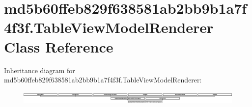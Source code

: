 \hypertarget{classmd5b60ffeb829f638581ab2bb9b1a7f4f3f_1_1TableViewModelRenderer}{}\section{md5b60ffeb829f638581ab2bb9b1a7f4f3f.\+Table\+View\+Model\+Renderer Class Reference}
\label{classmd5b60ffeb829f638581ab2bb9b1a7f4f3f_1_1TableViewModelRenderer}
Inheritance diagram for md5b60ffeb829f638581ab2bb9b1a7f4f3f.\+Table\+View\+Model\+Renderer\+:\begin{figure}[H]
\begin{center}
\leavevmode
\includegraphics[height=0.700000cm]{classmd5b60ffeb829f638581ab2bb9b1a7f4f3f_1_1TableViewModelRenderer}
\end{center}
\end{figure}
